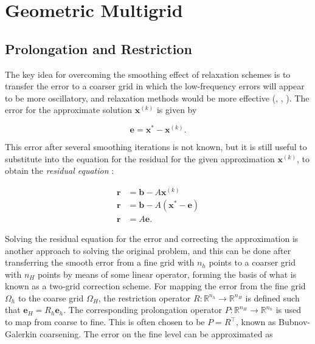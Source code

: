 \section{Geometric Multigrid}


\subsection{Prolongation and Restriction}

The key idea for overcoming the smoothing effect of relaxation schemes is to transfer the error to a coarser grid in which the low-frequency errors will appear to be more oscillatory, and relaxation methods would be more effective (\cite{Briggs2000}, \cite{Ruge1987}, \cite{Saad2003}). The error for the approximate solution $\mathbf{x}^{(k)}$ is given by

\begin{equation}
	\mathbf{e} = \mathbf{x}^* - \mathbf{x}^{(k)}.
\end{equation}

This error after several smoothing iterations is not known, but it is still useful to substitute into the equation for the residual for the given approximation $\mathbf{x}^{(k)}$, to obtain the \emph{residual equation} \cite{Briggs2000}:

\begin{equation}
	\begin{aligned}
	\mathbf{r} &= \mathbf{b} - A\mathbf{x}^{(k)} \\
	\mathbf{r} &= \mathbf{b} - A\left( \mathbf{x}^* - \mathbf{e} \right) \\
	\mathbf{r} &= A\mathbf{e}.
	\end{aligned}
\end{equation}

Solving the residual equation for the error and correcting the approximation is another approach to solving the original problem, and this can be done after transferring the smooth error from a fine grid with $n_h$ points to a coarser grid with $n_H$ points by means of some linear operator, forming the basis of what is known as a two-grid correction scheme. For mapping the error from the fine grid $\Omega_h$ to the coarse grid $\Omega_H$, the restriction operator $R : \mathbb{R}^{n_h} \rightarrow \mathbb{R}^{n_H}$ is defined such that $\mathbf{e}_H = R_h \mathbf{e}_h$. The corresponding prolongation operator $P : \mathbb{R}^{n_H} \rightarrow \mathbb{R}^{n_h}$ is used to map from coarse to fine. This is often chosen to be $P = R^\top$, known as Bubnov-Galerkin coarsening. The error on the fine level can be approximated as

